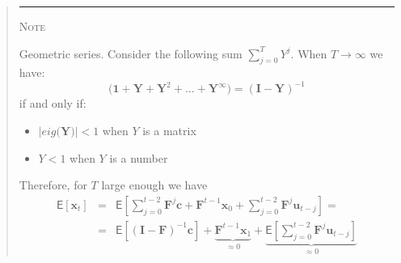 \documentclass[11pt,a4paper]{report}
\numberwithin{equation}{chapter}
\numberwithin{section}{chapter}
\begin{document}
%
\begin{quotation}
\noindent \rule{1cm}{.4pt}   {\scshape Note}   \hrulefill
\vspace{-.36cm}

\noindent \hrulefill
\small
\singlespacing
\color{note}\sffamily%

Geometric series. Consider the following sum $\sum\limits_{j=0}^{T}Y^{j}$.
When $T\rightarrow \infty $ we have: 
\begin{equation*}
\mathbf{(1+Y}+\mathbf{Y}^{2}+\mathbf{...}+\mathbf{Y}^{\infty }\mathbf{)=}%
\left( \mathbf{I}-\mathbf{Y}\right) ^{-1}
\end{equation*}%
if and only if:

\begin{itemize}
\item $\left\vert eig(\mathbf{Y)}\right\vert <1$ when $Y$ is a matrix

\item $Y<1$ when $Y$ is a number
\end{itemize}

\noindent Therefore, for $T$ large enough we have 
\begin{eqnarray*}
\mathsf{E}[\mathbf{x}_{t}] &=&\mathsf{E}\left[ \sum\limits_{j=0}^{t-2}%
\mathbf{F}^{j}\mathbf{c}+\mathbf{F}^{t-1}\mathbf{x}_{0}+\sum%
\limits_{j=0}^{t-2}\mathbf{F}^{j}\mathbf{u}_{t-j}\right] = \\
&=&\mathsf{E}\left[ \left( \mathbf{I}-\mathbf{F}\right) ^{-1}\mathbf{c}%
\right] +\underset{\approx 0}{\underbrace{\mathbf{F}^{t-1}\mathbf{x}_{1}}}+%
\underset{\approx 0}{\underbrace{\mathsf{E}\left[ \sum\limits_{j=0}^{t-2}%
\mathbf{F}^{j}\mathbf{u}_{t-j}\right] }}
\end{eqnarray*}

%
\color{black}
\noindent \hrulefill 
\vspace{-.5cm}

\noindent \hrulefill
\end{quotation}
\bigskip%
\end{document}
